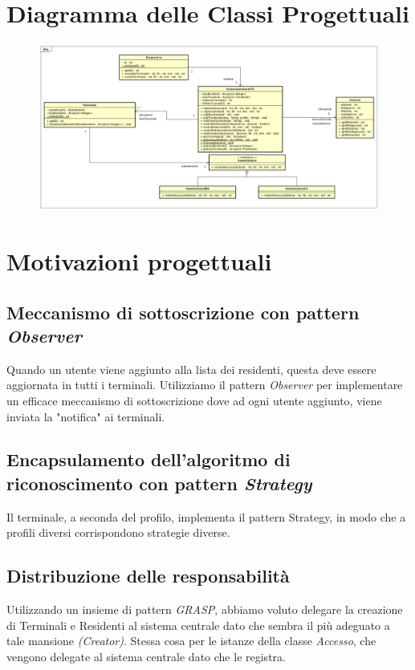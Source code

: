 \documentclass[12pt, letterpaper]{article}
\begin{document}
\section{Diagramma delle Classi Progettuali}
\begin{figure}[H]
    \centering
    \includegraphics[scale=0.25]{DiagrammaClassi}
    \label{fig:mesh1}
\end{figure}

\section{Motivazioni progettuali}

\subsection{Meccanismo di sottoscrizione con 
pattern \emph{Observer}}
Quando un utente viene aggiunto alla lista 
dei residenti, questa deve essere aggiornata 
in tutti i terminali. Utilizziamo il pattern 
\emph{Observer} per implementare un efficace 
meccanismo di sottoscrizione dove ad ogni 
utente aggiunto, viene inviata la "notifica" 
ai terminali.

\subsection{Encapsulamento dell'algoritmo di 
riconoscimento con pattern \emph{Strategy}}
Il terminale, a seconda del profilo, implementa 
il pattern Strategy, in modo che a profili diversi 
corrispondono strategie diverse.

\subsection{Distribuzione delle responsabilità}
Utilizzando un insieme di pattern \emph{GRASP},
abbiamo voluto delegare la creazione di Terminali
e Residenti al sistema centrale dato che sembra
il più adeguato a tale mansione \emph{(Creator)}.
Stessa cosa per le istanze della classe \emph{Accesso},
che vengono delegate al sistema centrale dato che 
le registra.
\end{document}
